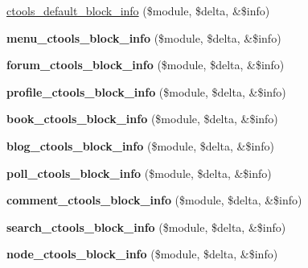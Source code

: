 \begin{DoxyCompactItemize}
\item 
\hyperlink{block_8inc_a124d6c84518ab0aa06724bd45b03fa38}{ctools\_\-default\_\-block\_\-info} (\$module, \$delta, \&\$info)
\item 
\hypertarget{block_8inc_a1eda9708006ab1b2171a8f055a2cdf7c}{
{\bfseries menu\_\-ctools\_\-block\_\-info} (\$module, \$delta, \&\$info)}
\label{block_8inc_a1eda9708006ab1b2171a8f055a2cdf7c}

\item 
\hypertarget{block_8inc_a4bc3b493021438576bf0ddd0c36bb7e3}{
{\bfseries forum\_\-ctools\_\-block\_\-info} (\$module, \$delta, \&\$info)}
\label{block_8inc_a4bc3b493021438576bf0ddd0c36bb7e3}

\item 
\hypertarget{block_8inc_abbb872ed0618795e14e83339fedc6f50}{
{\bfseries profile\_\-ctools\_\-block\_\-info} (\$module, \$delta, \&\$info)}
\label{block_8inc_abbb872ed0618795e14e83339fedc6f50}

\item 
\hypertarget{block_8inc_a7193c5e86f4a0496c2fa0f492d469901}{
{\bfseries book\_\-ctools\_\-block\_\-info} (\$module, \$delta, \&\$info)}
\label{block_8inc_a7193c5e86f4a0496c2fa0f492d469901}

\item 
\hypertarget{block_8inc_a9ea489ec9b7fdf16cc807e189171ed81}{
{\bfseries blog\_\-ctools\_\-block\_\-info} (\$module, \$delta, \&\$info)}
\label{block_8inc_a9ea489ec9b7fdf16cc807e189171ed81}

\item 
\hypertarget{block_8inc_a40057c5269a874f4f1544ed2fe9885d6}{
{\bfseries poll\_\-ctools\_\-block\_\-info} (\$module, \$delta, \&\$info)}
\label{block_8inc_a40057c5269a874f4f1544ed2fe9885d6}

\item 
\hypertarget{block_8inc_ab91a869e3215e5a7fcb0abf8f8e5effe}{
{\bfseries comment\_\-ctools\_\-block\_\-info} (\$module, \$delta, \&\$info)}
\label{block_8inc_ab91a869e3215e5a7fcb0abf8f8e5effe}

\item 
\hypertarget{block_8inc_aaf2e4903bb2de0539cbf198952608f7a}{
{\bfseries search\_\-ctools\_\-block\_\-info} (\$module, \$delta, \&\$info)}
\label{block_8inc_aaf2e4903bb2de0539cbf198952608f7a}

\item 
\hypertarget{block_8inc_ae3fff67c24928594d78da914fefbb865}{
{\bfseries node\_\-ctools\_\-block\_\-info} (\$module, \$delta, \&\$info)}
\label{block_8inc_ae3fff67c24928594d78da914fefbb865}


\end{DoxyCompactItemize}
